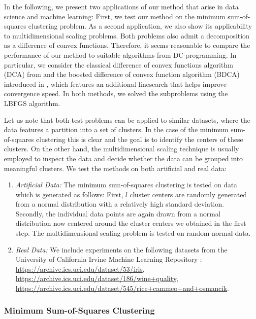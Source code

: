 \documentclass[a4paper, 12pt]{article}
\numberwithin{equation}{section}
\theoremstyle{bolddef}
\theoremstyle{definition}
\theoremstyle{boldplain}
\begin{document}
In the following, we present two applications of our method that arise in data science and machine learning: First, we test our method on the minimum sum-of-squares clustering problem. As a second application, we also show its applicability to multidimensional scaling problems. Both problems also admit a decomposition as a difference of convex functions. Therefore, it seems reasonable to compare the performance of our method to suitable algorithms from DC-programming. In particular, we consider the classical difference of convex functions algorithm (DCA) from \cite{LeThi1996} and the boosted difference of convex function algorithm (BDCA) introduced in \cite{aragon2020}, which features an additional linesearch that helps improve convergence speed. In both methods, we solved the subproblems using the LBFGS algorithm.

Let us note that both test problems can be applied to similar datasets, where the data features a partition into a set of clusters. In the case of the minimum sum-of-squares clustering this is clear and the goal is to identify the centers of these clusters. On the other hand, the multidimensional scaling technique is usually employed to inspect the data and decide whether the data can be grouped into meaningful clusters. We test the methods on both artificial and real data:
\begin{enumerate}
	\item \emph{Artificial Data:} The minimum sum-of-squares clustering is tested on data which is generated as follows: First, $l$ cluster centers are randomly generated from a normal distribution with a relatively high standard deviation. Secondly, the individual data points are again drawn from a normal distribution now centered around the cluster centers we obtained in the first step. The multidimensional scaling problem is tested on random normal data.
	\item \emph{Real Data:} We include experiments on the following datasets from the University of California Irvine Machine Learning Repository \cite{ucimlr}: \url{https://archive.ics.uci.edu/dataset/53/iris}, \url{https://archive.ics.uci.edu/dataset/186/wine+quality}, \url{https://archive.ics.uci.edu/dataset/545/rice+cammeo+and+osmancik}.
\end{enumerate}

\subsubsection{Minimum Sum-of-Squares Clustering}
\end{document}
